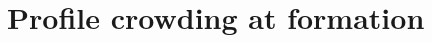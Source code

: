 \documentclass[9pt,aspectratio=169,t]{beamer}
\newcommand{\sectiontag}{Motivation}
\begin{document}
\renewcommand{\appendixname}{Appendix}
\appendix
\edef\scaLastMainFrame{\arabic{framenumber}}
\renewcommand{\insertframenumber}{A\the\numexpr\value{framenumber}-\scaLastMainFrame\relax}
\section{Profile crowding at formation}
\renewcommand{\sectiontag}{Appendix / Formation diagnostics}
\newcommand{\scaTopExposureReduction}[1]{\begingroup\setlength{\fboxsep}{0pt}\leavevmode
  \colorbox{appendixTint}{\makebox[\linewidth][c]{\color{titleink}\strut\(\mathbf{#1}\)}}\endgroup}
\end{document}
